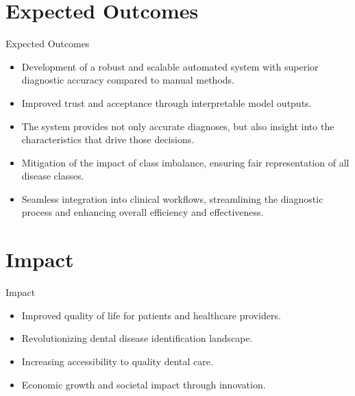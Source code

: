 \documentclass{beamer}
\begin{document}
\section[Expected Outcomes]{Expected Outcomes}

\begin{frame}{Expected Outcomes}
  \begin{itemize}
    \item Development of a robust and scalable automated system with superior diagnostic accuracy compared to manual methods.
    \item Improved trust and acceptance through interpretable model outputs.
    \item The system provides not only accurate diagnoses, but also insight into the characteristics that drive those decisions.
    \item Mitigation of the impact of class imbalance, ensuring fair representation of all disease classes.
    \item Seamless integration into clinical workflows, streamlining the diagnostic process and enhancing overall efficiency and effectiveness.
  \end{itemize}
\end{frame}



\section[Impact]{Impact}

\begin{frame}{Impact}
\begin{itemize}
    \item Improved quality of life for patients and healthcare providers.
    \item Revolutionizing dental disease identification landscape.
    \item Increasing accessibility to quality dental care.
    \item Economic growth and societal impact through innovation.
\end{itemize}
\end{frame}
\end{document}
